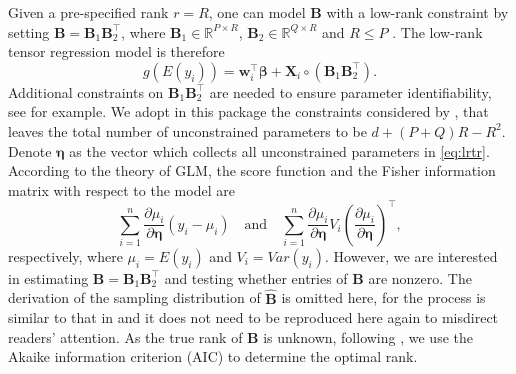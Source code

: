 Given a pre-specified rank \(r = R\), one can model \(\mathbf{B}\) with
a low-rank constraint by setting
\(\mathbf{B} = \mathbf{B}_1\mathbf{B}_2^{\top}\), where
\(\mathbf{B}_1\in\mathbb{R}^{P\times R}\),
\(\mathbf{B}_2\in\mathbb{R}^{Q\times R}\) and \(R\leq P\)
\citep{Zhou2013Tensor,ChangYang2021bioinformatics}. The low-rank tensor
regression model is therefore \begin{equation} 
    g\left(E(y_i)\right) = \mathbf{w}_i^{\top}\boldsymbol{\beta} + \mathbf{X}_i \circ \left(\mathbf{B}_1\mathbf{B}_2^{\top}\right). \label{eq:lrtr}
\end{equation} Additional constraints on
\(\mathbf{B}_1\mathbf{B}_2^{\top}\) are needed to ensure parameter
identifiability, see \citet{Zhou2013Tensor} for example. We adopt in
this package the constraints considered by
\citet{ChangYang2021bioinformatics}, that leaves the total number of
unconstrained parameters to be \(d + (P + Q)R - R^2\). Denote
\(\boldsymbol \eta\) as the vector which collects all unconstrained
parameters in \eqref{eq:lrtr}. According to the theory of GLM, the score
function and the Fisher information matrix with respect to the model are
\[
  \sum_{i=1}^n \frac{\partial \mu_i}{\partial \boldsymbol \eta}(y_i - \mu_i)
  \quad \mbox{and} \quad
    \sum_{i=1}^n \frac{\partial \mu_i}{\partial \boldsymbol \eta}V_i \left(\frac{\partial \mu_i}{\partial \boldsymbol \eta}\right)^{\top},
\] respectively, where \(\mu_i = E(y_i)\) and \(V_i = Var(y_i)\).
However, we are interested in estimating
\(\mathbf{B}=\mathbf{B}_1\mathbf{B}_2^{\top}\) and testing whether
entries of \(\mathbf B\) are nonzero. The derivation of the sampling
distribution of \(\hat{\mathbf{B}}\) is omitted here, for the process is
similar to that in \citet{ChangYang2021bioinformatics} and it does not
need to be reproduced here again to misdirect readers' attention. As the
true rank of \(\mathbf{B}\) is unknown, following
\citet{ChangYang2021bioinformatics}, we use the Akaike information
criterion (AIC) to determine the optimal rank.

